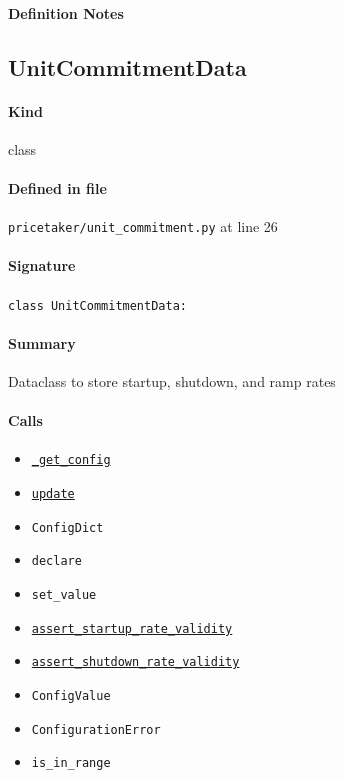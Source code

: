 \documentclass[11pt]{report}
\begin{document}
\paragraph{Definition Notes}
\subsection{UnitCommitmentData}
\label{def:pricetaker-unit_commitment.py:UnitCommitmentData:L26}
\paragraph{Kind} class
\paragraph{Defined in file} \texttt{pricetaker/unit\_commitment.py} at line 26
\paragraph{Signature} \texttt{class UnitCommitmentData:}
\paragraph{Summary} Dataclass to store startup, shutdown, and ramp rates
\paragraph{Calls}
\begin{itemize}[leftmargin=*]
  \item \hyperref[def:pricetaker-unit_commitment.py:UnitCommitmentData._get_config:L35]{\texttt{\_get\_config}}
  \item \hyperref[def:pricetaker-unit_commitment.py:UnitCommitmentData.update:L84]{\texttt{update}}
  \item \texttt{ConfigDict}
  \item \texttt{declare}
  \item \texttt{set\_value}
  \item \hyperref[def:pricetaker-unit_commitment.py:UnitCommitmentData.assert_startup_rate_validity:L90]{\texttt{assert\_startup\_rate\_validity}}
  \item \hyperref[def:pricetaker-unit_commitment.py:UnitCommitmentData.assert_shutdown_rate_validity:L103]{\texttt{assert\_shutdown\_rate\_validity}}
  \item \texttt{ConfigValue}
  \item \texttt{ConfigurationError}
  \item \texttt{is\_in\_range}
\end{itemize}
\end{document}
